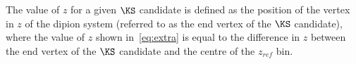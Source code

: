 
The value of $z$ for a given $\KS$ candidate is defined as the position of the vertex in $z$ of the dipion system (referred to as the end vertex of the $\KS$ candidate), where the value of $z$ shown in~\autoref{eq:extra} is equal to the difference in $z$ between the end vertex of the $\KS$ candidate and the centre of the $z_{ref}$ bin. 

